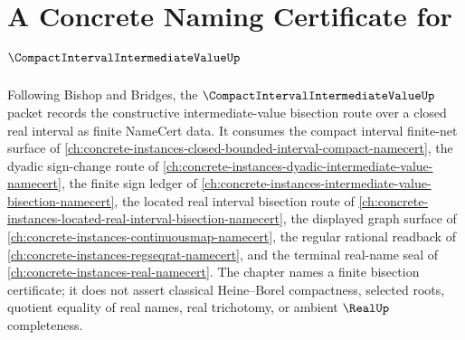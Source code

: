\chapter{A Concrete Naming Certificate for $\CompactIntervalIntermediateValueUp$}
\label{ch:concrete-instances-compact-interval-intermediate-value-namecert}

Following Bishop and Bridges, the $\CompactIntervalIntermediateValueUp$ packet records the constructive intermediate-value bisection route over a closed real interval as finite NameCert data. It consumes the compact interval finite-net surface of \autoref{ch:concrete-instances-closed-bounded-interval-compact-namecert}, the dyadic sign-change route of \autoref{ch:concrete-instances-dyadic-intermediate-value-namecert}, the finite sign ledger of \autoref{ch:concrete-instances-intermediate-value-bisection-namecert}, the located real interval bisection route of \autoref{ch:concrete-instances-located-real-interval-bisection-namecert}, the displayed graph surface of \autoref{ch:concrete-instances-continuousmap-namecert}, the regular rational readback of \autoref{ch:concrete-instances-regseqrat-namecert}, and the terminal real-name seal of \autoref{ch:concrete-instances-real-namecert}. The chapter names a finite bisection certificate; it does not assert classical Heine--Borel compactness, selected roots, quotient equality of real names, real trichotomy, or ambient $\RealUp$ completeness.

